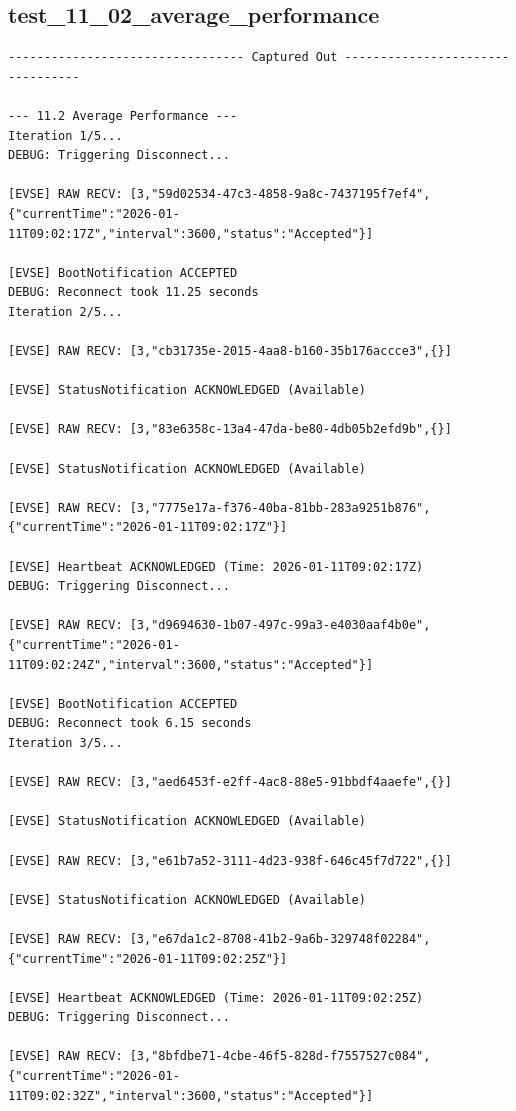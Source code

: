 \documentclass{article}
\begin{document}
\subsection*{test\_11\_02\_average\_performance}
\begin{lstlisting}
--------------------------------- Captured Out ---------------------------------

--- 11.2 Average Performance ---
Iteration 1/5...
DEBUG: Triggering Disconnect...

[EVSE] RAW RECV: [3,"59d02534-47c3-4858-9a8c-7437195f7ef4",{"currentTime":"2026-01-11T09:02:17Z","interval":3600,"status":"Accepted"}]

[EVSE] BootNotification ACCEPTED
DEBUG: Reconnect took 11.25 seconds
Iteration 2/5...

[EVSE] RAW RECV: [3,"cb31735e-2015-4aa8-b160-35b176accce3",{}]

[EVSE] StatusNotification ACKNOWLEDGED (Available)

[EVSE] RAW RECV: [3,"83e6358c-13a4-47da-be80-4db05b2efd9b",{}]

[EVSE] StatusNotification ACKNOWLEDGED (Available)

[EVSE] RAW RECV: [3,"7775e17a-f376-40ba-81bb-283a9251b876",{"currentTime":"2026-01-11T09:02:17Z"}]

[EVSE] Heartbeat ACKNOWLEDGED (Time: 2026-01-11T09:02:17Z)
DEBUG: Triggering Disconnect...

[EVSE] RAW RECV: [3,"d9694630-1b07-497c-99a3-e4030aaf4b0e",{"currentTime":"2026-01-11T09:02:24Z","interval":3600,"status":"Accepted"}]

[EVSE] BootNotification ACCEPTED
DEBUG: Reconnect took 6.15 seconds
Iteration 3/5...

[EVSE] RAW RECV: [3,"aed6453f-e2ff-4ac8-88e5-91bbdf4aaefe",{}]

[EVSE] StatusNotification ACKNOWLEDGED (Available)

[EVSE] RAW RECV: [3,"e61b7a52-3111-4d23-938f-646c45f7d722",{}]

[EVSE] StatusNotification ACKNOWLEDGED (Available)

[EVSE] RAW RECV: [3,"e67da1c2-8708-41b2-9a6b-329748f02284",{"currentTime":"2026-01-11T09:02:25Z"}]

[EVSE] Heartbeat ACKNOWLEDGED (Time: 2026-01-11T09:02:25Z)
DEBUG: Triggering Disconnect...

[EVSE] RAW RECV: [3,"8bfdbe71-4cbe-46f5-828d-f7557527c084",{"currentTime":"2026-01-11T09:02:32Z","interval":3600,"status":"Accepted"}]


\end{lstlisting}
\end{document}
